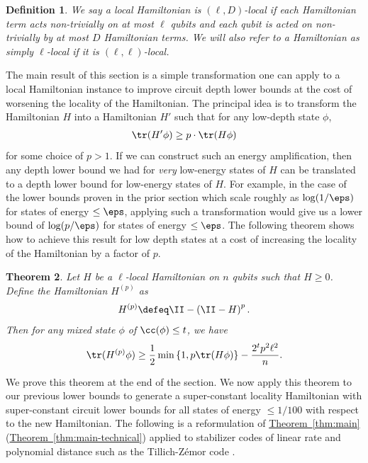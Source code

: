 \documentclass[11pt]{article}
\newcommand{\expref}[2]{\texorpdfstring{\hyperref[#2]{#1~\ref{#2}}}{#1~\ref{#2}}}
\newtheorem{theorem}{Theorem}[section]
\newtheorem{definition}[theorem]{Definition}
\begin{document}
\begin{definition}
We say a local Hamiltonian is $(\ell, D)$-local if each Hamiltonian term acts non-trivially on at most $\ell$ qubits and each qubit is acted on non-trivially by at most $D$ Hamiltonian terms. We will also refer to a Hamiltonian as simply $\ell$-local if it is $(\ell, \ell)$-local.
\end{definition}
The main result of this section is a simple transformation one can apply to a local Hamiltonian instance to improve circuit depth lower bounds at the cost of worsening the locality of the Hamiltonian. The principal idea is to transform the Hamiltonian $H$ into a Hamiltonian $H'$ such that for any low-depth state $\phi$, 
\begin{align}\tr(H' \phi) \geq p \cdot \tr(H \phi)
\end{align}
for some choice of $p > 1$. If we can construct such an energy amplification, then any depth lower bound we had for \emph{very} low-energy states of $H$ can be translated to a depth lower bound for low-energy states of $H$. For example, in the case of the lower bounds proven in the prior section which scale roughly as $\log (1/\eps)$ for states of energy $\leq \eps $, applying such a transformation would give us a lower bound of $\log(p/\eps)$ for states of energy $\leq \eps$.
The following theorem shows how to achieve this result for low depth states at a cost of increasing the locality of the Hamiltonian by a factor of $p$. 


\begin{theorem}
Let $H$ be a $\ell$-local Hamiltonian on $n$ qubits such that $H \geq 0$. Define the Hamiltonian $H^{(p)}$ as
\begin{align}
    H^{(p)} \defeq  \II - \left( \II - H \right)^p.
\end{align}
Then for any mixed state $\phi$ of $\cc(\phi) \leq t$, we have
\begin{align}
    \tr(H^{(p)} \phi) \geq \frac{1}{2} \min \left\{1, p \tr(H \phi ) \right\} - \frac{2^t p^2\ell^2}{n}.
\end{align}
\label{thm:amplification}
\end{theorem}
We prove this theorem at the end of the section. We now apply this theorem to our previous lower bounds to generate a super-constant locality Hamiltonian with super-constant circuit lower bounds for all states of energy $\leq 1/100$ with respect to the new Hamiltonian. The following is a reformulation of \expref{Theorem}{thm:main} (\expref{Theorem}{thm:main-technical}) applied to stabilizer codes of linear rate and polynomial distance such as the Tillich-Z\'emor code \cite{5205648}.
\end{document}
